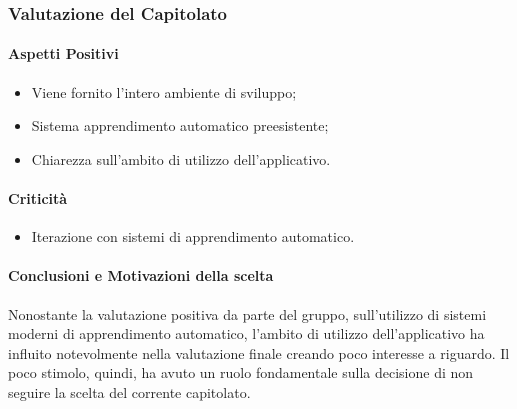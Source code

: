 \subsubsection{Valutazione del Capitolato}

\paragraph{Aspetti Positivi}
\begin{itemize}
	\item Viene fornito l'intero ambiente di sviluppo;
	\item Sistema apprendimento automatico preesistente;
	\item Chiarezza sull'ambito di utilizzo dell'applicativo.
\end{itemize}

\paragraph{Criticità}
\begin{itemize}
	\item Iterazione con sistemi di apprendimento automatico.
\end{itemize}

\paragraph{Conclusioni e Motivazioni della scelta} 
Nonostante la valutazione positiva da parte del gruppo, sull'utilizzo di sistemi moderni di apprendimento automatico, l'ambito di utilizzo dell'applicativo ha influito notevolmente nella valutazione finale creando poco interesse a riguardo.
Il poco stimolo, quindi, ha avuto un ruolo fondamentale sulla decisione di non seguire la scelta del corrente capitolato.